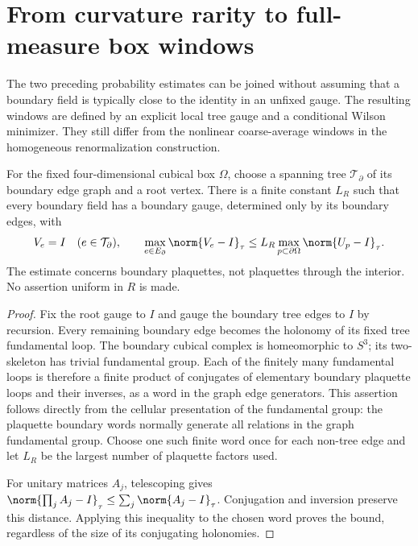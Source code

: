 \section{From curvature rarity to full-measure box windows}
\label{fbb:section}

The two preceding probability estimates can be joined without
assuming that a boundary field is typically close to the identity
in an unfixed gauge. The resulting windows are defined by an
explicit local tree gauge and a conditional Wilson minimizer.
They still differ from the nonlinear coarse-average windows in
the homogeneous renormalization construction.

\begin{lemma}
\label{fbb:boundarygauge}
For the fixed four-dimensional cubical box \(\Omega\), choose a
spanning tree \(\mathcal T_\partial\) of its boundary edge graph
and a root vertex. There is a finite constant \(L_R\) such that
every boundary field has a boundary gauge, determined only by its
boundary edges, with
\[
 V_e=I\quad(e\in\mathcal T_\partial),\qquad
 \max_{e\in E_\partial}\norm{V_e-I}_\tau
 \leq L_R\max_{p\subset\partial\Omega}\norm{U_p-I}_\tau.
\]
The estimate concerns boundary plaquettes, not plaquettes through
the interior. No assertion uniform in \(R\) is made.
\end{lemma}
\begin{proof}
Fix the root gauge to \(I\) and gauge the boundary tree edges to \(I\)
by recursion. Every remaining boundary edge becomes the holonomy
of its fixed tree fundamental loop. The boundary cubical complex is
homeomorphic to \(S^3\); its two-skeleton has trivial fundamental
group. Each of the finitely many fundamental loops is therefore a
finite product of conjugates of elementary boundary plaquette
loops and their inverses, as a word in the graph edge generators.
This assertion follows directly from the cellular presentation of
the fundamental group: the plaquette boundary words normally
generate all relations in the graph fundamental group. Choose one
such finite word once for each non-tree edge and let \(L_R\) be the
largest number of plaquette factors used.

For unitary matrices \(A_j\), telescoping gives
\(\norm{\prod_j A_j-I}_\tau\leq\sum_j\norm{A_j-I}_\tau\).
Conjugation and inversion preserve this distance. Applying this
inequality to the chosen word proves the bound, regardless of
the size of its conjugating holonomies.
\end{proof}

